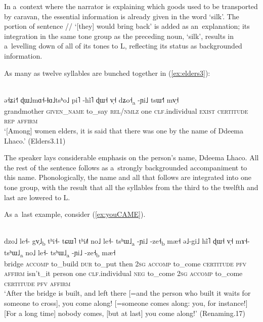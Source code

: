 In a~context where the narrator is explaining which goods used to be transported by caravan, the
essential information is already given in the word ‘silk’. The portion of sentence // ‘[they] would bring back’ is added as an~explanation; its integration in the same tone group as the preceding noun, ‘silk’, results in a~levelling down of all of its
tones to L, reflecting its status as backgrounded information.

As many as twelve syllables are bunched together in (\ref{ex:elders3}):

\begin{exe}
	\ex
	\label{ex:elders3}
	\\
	\gll ə˧ʑi˧˥		ɖɯ˩mɑ˧-ɬɑ˩tsʰo˩		pi˥		-hĩ˥ ɖɯ˧	v̩˧		dʑo˧\textsubscript{a}	-ɲi˩		tsɯ˧˥		mv̩˧\\
	grandmother		\textsc{given\_name}	to\_say		\textsc{rel/nmlz}	one	\textsc{clf}.individual		\textsc{exist}	\textsc{certitude}	\textsc{rep}	\textsc{affirm}\\
	\glt ‘[Among] women elders, it is said that there was one by the
	name of Ddeema Lhaco.’ (Elders3.11)
\end{exe}

The speaker lays considerable emphasis on the person’s name,
Ddeema Lhaco. All the rest of the sentence follows as a~strongly backgrounded
accompaniment to this name. Phonologically, the name and all that follows are integrated into
one tone group, with the result that all the syllables from the third to the twelfth and last
are lowered to L.

As a~last example, consider (\ref{ex:youCAME}).

\begin{exe}
	\ex
	\label{ex:youCAME}
	\\
	\gll dzo˩		le˧-	gv̩˩\textsubscript{b}	tʰi˧-	tɕɯ˥	tʰi˩˥	no˩	le˧-	tsʰɯ˩\textsubscript{a}	-ɲi˩		-ze˧\textsubscript{b}		mæ˧	ə˩-gi˩		hĩ˥	ɖɯ˧		v̩˧		mɤ˧-		tsʰɯ˩\textsubscript{a}	no˩	le˧-	tsʰɯ˩\textsubscript{a}	-ɲi˩		-ze˧\textsubscript{b}		mæ˧\\
	bridge		\textsc{accomp}	to\_build		\textsc{dur}	to\_put		then 2\textsc{sg}	\textsc{accomp}		to\_come	\textsc{certitude}	\textsc{pfv}	\textsc{affirm}		isn't\_it	person	one	\textsc{clf}.individual		\textsc{neg}	to\_come	2\textsc{sg}	\textsc{accomp}		to\_come	\textsc{certitude}	\textsc{pfv}	\textsc{affirm}\\
	\glt ‘After the bridge is built, and left there [=and the person who built it waits for someone to cross], you come along! [=someone comes along: you, for instance!] [For a long time] nobody comes, [but at last] you come along!’ (Renaming.17)
\end{exe}

